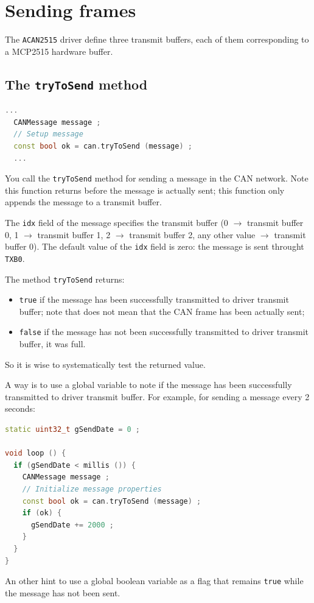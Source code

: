 \documentclass[9pt, a4paper, obeyspaces]{extarticle}
\newcommand \sectionLabel[2]{\section{#1}\label{sec:#2}}
\newcommand \subsectionLabel[2]{\subsection{#1}\label{subsec:#2}}
\begin{document}
\sectionLabel{Sending frames}{sendingFrames}

The \texttt{ACAN2515} driver define three transmit buffers, each of them corresponding to a MCP2515 hardware buffer.

\subsectionLabel{The \texttt{tryToSend} method}{tryToSendMethod}

{\small\begin{lstlisting}[language=c++]
  ...
  CANMessage message ;
  // Setup message
  const bool ok = can.tryToSend (message) ;
  ...
\end{lstlisting}}

You call the \texttt{tryToSend} method for sending a message in the CAN network. Note this function returns before the message is actually sent; this function only appends the message to a transmit buffer.

The \texttt{idx} field of the message specifies the transmit buffer (0 $\rightarrow$ transmit buffer 0, 1 $\rightarrow$ transmit buffer 1, 2 $\rightarrow$ transmit buffer 2, any other value $\rightarrow$ transmit buffer 0). The default value of the \texttt{idx} field is zero: the message is sent throught \texttt{TXB0}.

The method \texttt{tryToSend} returns:
\begin{itemize}
  \item \texttt{true} if the message has been successfully transmitted to driver transmit buffer; note that does not mean that the CAN frame has been actually sent;
  \item \texttt{false} if the message has not been successfully transmitted to driver transmit buffer, it was full.
\end{itemize}

So it is wise to systematically test the returned value.

A way is to use a global variable to note if the message has been successfully transmitted to driver transmit buffer. For example, for sending a message every 2 seconds: 

{\small\begin{lstlisting}[language=c++]
static uint32_t gSendDate = 0 ;

void loop () {
  if (gSendDate < millis ()) {
    CANMessage message ;
    // Initialize message properties
    const bool ok = can.tryToSend (message) ;
    if (ok) {
      gSendDate += 2000 ;
    }
  }
}
\end{lstlisting}}

An other hint to use a global boolean variable as a flag that remains \texttt{true} while the message has not been sent.
\end{document}

